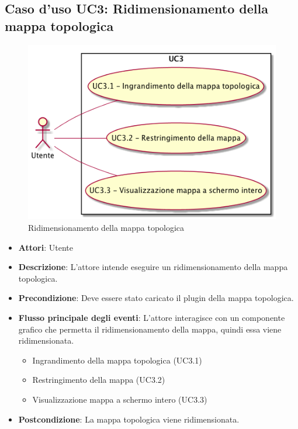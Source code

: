 \subsection{Caso d'uso UC3: Ridimensionamento della mappa topologica}
\begin{figure} [H]
	\centering
	\includegraphics[scale=0.45]{./UC/UC3.png}
	\caption{Ridimensionamento della mappa topologica}\label{}
\end{figure}
\begin{itemize}
	\item \textbf{Attori}: Utente
	\item \textbf{Descrizione}: L'attore intende eseguire un ridimensionamento della mappa topologica.
	\item \textbf{Precondizione}: Deve essere stato caricato il plugin della mappa topologica.
	\item \textbf{Flusso principale degli eventi}: L'attore interagisce con un componente grafico che permetta il ridimensionamento della mappa, quindi essa viene ridimensionata.
	\begin{itemize}
		\item Ingrandimento della mappa topologica (UC3.1)
		\item Restringimento della mappa (UC3.2)
		\item Visualizzazione mappa a schermo intero (UC3.3)
	\end{itemize}
	\item \textbf{Postcondizione}: La mappa topologica viene ridimensionata.
\end{itemize}

